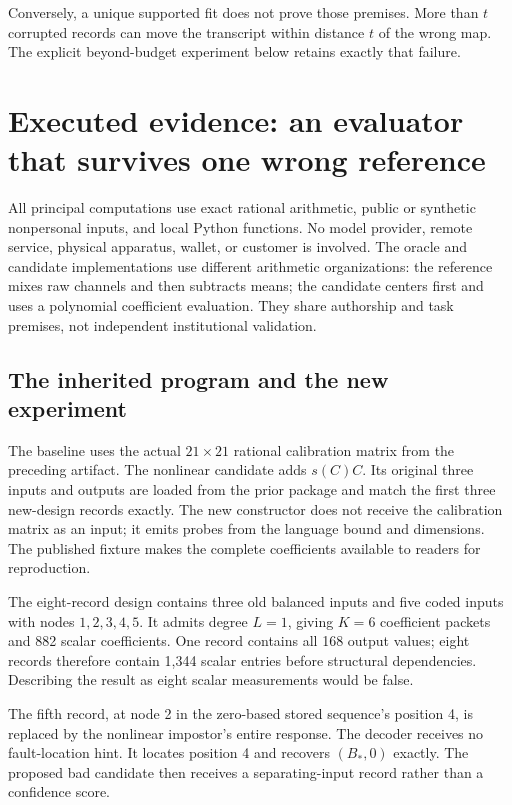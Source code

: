 \documentclass[11pt,letterpaper]{article}
\theoremstyle{remark}\newtheorem{remark}{Remark}[section]
\begin{document}
Conversely, a unique supported fit does not prove those premises. More than $t$ corrupted records can move the transcript within distance $t$ of the wrong map. The explicit beyond-budget experiment below retains exactly that failure.

\section{Executed evidence: an evaluator that survives one wrong reference}
\label{sec:results}
All principal computations use exact rational arithmetic, public or synthetic nonpersonal inputs, and local Python functions. No model provider, remote service, physical apparatus, wallet, or customer is involved. The oracle and candidate implementations use different arithmetic organizations: the reference mixes raw channels and then subtracts means; the candidate centers first and uses a polynomial coefficient evaluation. They share authorship and task premises, not independent institutional validation.

\subsection{The inherited program and the new experiment}
The baseline uses the actual $21\times21$ rational calibration matrix from the preceding artifact. The nonlinear candidate adds $s(C)C$. Its original three inputs and outputs are loaded from the prior package and match the first three new-design records exactly. The new constructor does not receive the calibration matrix as an input; it emits probes from the language bound and dimensions. The published fixture makes the complete coefficients available to readers for reproduction.

The eight-record design contains three old balanced inputs and five coded inputs with nodes $1,2,3,4,5$. It admits degree $L=1$, giving $K=6$ coefficient packets and 882 scalar coefficients. One record contains all 168 output values; eight records therefore contain 1,344 scalar entries before structural dependencies. Describing the result as eight scalar measurements would be false.

The fifth record, at node 2 in the zero-based stored sequence's position 4, is replaced by the nonlinear impostor's entire response. The decoder receives no fault-location hint. It locates position 4 and recovers $(B_*,0)$ exactly. The proposed bad candidate then receives a separating-input record rather than a confidence score.
\end{document}
